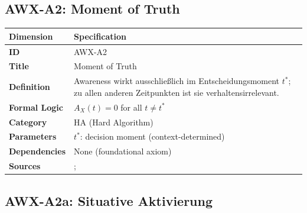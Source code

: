 
\subsection{AWX-A2: Moment of Truth}

\begin{table}[htbp]
\small
\begin{tabular}{p{3cm}p{11cm}}
\toprule
\textbf{Dimension} & \textbf{Specification} \\
\midrule
\textbf{ID} & AWX-A2 \\
\textbf{Title} & Moment of Truth \\
\textbf{Definition} & Awareness wirkt ausschließlich im Entscheidungsmoment $t^*$; zu allen anderen Zeitpunkten ist sie verhaltensirrelevant. \\
\textbf{Formal Logic} & $A_X(t) = 0$ for all $t \neq t^*$ \\
\textbf{Category} & HA (Hard Algorithm) \\
\textbf{Parameters} & $t^*$: decision moment (context-determined) \\
\textbf{Dependencies} & None (foundational axiom) \\
\textbf{Sources} & \citet{PAP-PAP-kahneman1979prospectprospect}; \citet{PAP-tversky1981framing} \\
\bottomrule
\end{tabular}
\end{table}


\subsection{AWX-A2a: Situative Aktivierung}

